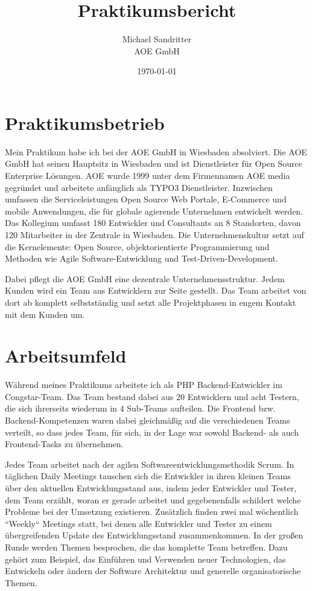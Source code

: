 \documentclass[11pt,a4paper]{article} %
\title{Praktikumsbericht}
\author{Michael Sandritter \\ AOE GmbH}
\date{\today}
\begin{document}
\maketitle %


\newpage %

\section{Praktikumsbetrieb} \label{sec:betrieb} 

Mein Praktikum habe ich bei der AOE GmbH in Wiesbaden absolviert. 
Die AOE GmbH hat seinen Hauptsitz in Wiesbaden und ist Dienstleister für Open
Source Enterprise Lösungen.
AOE wurde 1999 unter dem Firmennamen AOE media gegründet und arbeitete
anfänglich als TYPO3 Dienstleister.
Inzwischen umfassen die Serviceleistungen Open Source Web Portale, E-Commerce und mobile Anwendungen, 
die für globale agierende Unternehmen entwickelt werden. 
Das Kollegium umfasst 180 Entwickler und Consultants an 8 Standorten, davon 120 Mitarbeiter in der Zentrale in Wiesbaden. 
Die Unternehmenskultur setzt auf die Kernelemente: Open Source, objektorientierte Programmierung und Methoden 
wie Agile Software-Entwicklung und Test-Driven-Development. 

Dabei pflegt die AOE GmbH eine dezentrale Unternehmensstruktur. Jedem Kunden wird ein Team aus Entwicklern zur Seite gestellt. 
Das Team arbeitet von dort ab komplett selbstständig und setzt alle
Projektphasen in engem Kontakt mit dem Kunden um.

\section{Arbeitsumfeld} \label{sec:umfeld}

Während meines Praktikums arbeitete ich als PHP Backend-Entwickler im Congstar-Team.
Das Team bestand dabei aus 20 Entwicklern und acht Testern, die sich ihrerseits wiederum in 4 Sub-Teams aufteilen.
Die Frontend bzw. Backend-Kompetenzen waren dabei gleichmäßig auf die
verschiedenen Teams verteilt, so dass jedes Team, für sich, in der Lage war sowohl Backend- als auch
 Frontend-Tasks zu übernehmen.

Jedes Team arbeitet nach der agilen Softwareentwicklungsmethodik Scrum.
In täglichen Daily Meetings tauschen sich die Entwickler in ihren kleinen Teams über den aktuellen Entwicklungsstand aus, indem jeder Entwickler und Tester, dem Team erzählt, woran er gerade arbeitet und gegebenenfalls schildert welche Probleme bei der Umsetzung existieren.
Zusätzlich finden zwei mal wöchentlich “Weekly“ Meetings statt, bei denen alle Entwickler und Tester zu einem übergreifenden Update des Entwicklungsstand zusammenkommen.
In der großen Runde werden Themen besprochen, die das komplette Team betreffen.
Dazu gehört zum Beispiel, das Einführen und Verwenden neuer Technologien, das Entwickeln oder ändern der Software Architektur und generelle organisatorische Themen.
\end{document}
